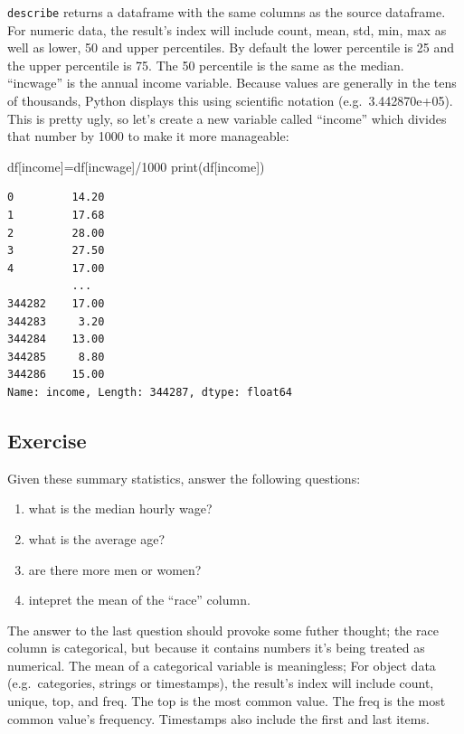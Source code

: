 \documentclass[
  letterpaper,
  DIV=11,
  numbers=noendperiod]{scrreprt}
\newenvironment{Shaded}{\begin{snugshade}}{\end{snugshade}}
\newcommand{\BuiltInTok}[1]{\textcolor[rgb]{0.00,0.23,0.31}{#1}}
\newcommand{\DecValTok}[1]{\textcolor[rgb]{0.68,0.00,0.00}{#1}}
\newcommand{\NormalTok}[1]{\textcolor[rgb]{0.00,0.23,0.31}{#1}}
\newcommand{\OperatorTok}[1]{\textcolor[rgb]{0.37,0.37,0.37}{#1}}
\newcommand{\StringTok}[1]{\textcolor[rgb]{0.13,0.47,0.30}{#1}}
\providecommand{\tightlist}{%
  \setlength{\itemsep}{0pt}\setlength{\parskip}{0pt}}\usepackage{longtable,booktabs,array}
\begin{document}
\texttt{describe} returns a dataframe with the same columns as the
source dataframe. For numeric data, the result's index will include
count, mean, std, min, max as well as lower, 50 and upper percentiles.
By default the lower percentile is 25 and the upper percentile is 75.
The 50 percentile is the same as the median. ``incwage'' is the annual
income variable. Because values are generally in the tens of thousands,
Python displays this using scientific notation (e.g.~3.442870e+05). This
is pretty ugly, so let's create a new variable called ``income'' which
divides that number by 1000 to make it more manageable:

\begin{Shaded}
\begin{Highlighting}[]
\NormalTok{df[}\StringTok{\textquotesingle{}income\textquotesingle{}}\NormalTok{]}\OperatorTok{=}\NormalTok{df[}\StringTok{\textquotesingle{}incwage\textquotesingle{}}\NormalTok{]}\OperatorTok{/}\DecValTok{1000}
\BuiltInTok{print}\NormalTok{(df[}\StringTok{\textquotesingle{}income\textquotesingle{}}\NormalTok{])}
\end{Highlighting}
\end{Shaded}

\begin{verbatim}
0         14.20
1         17.68
2         28.00
3         27.50
4         17.00
          ...  
344282    17.00
344283     3.20
344284    13.00
344285     8.80
344286    15.00
Name: income, Length: 344287, dtype: float64
\end{verbatim}

\hypertarget{exercise-11}{%
\subsection{Exercise}\label{exercise-11}}

Given these summary statistics, answer the following questions:

\begin{enumerate}
\def\labelenumi{\arabic{enumi}.}
\tightlist
\item
  what is the median hourly wage?
\item
  what is the average age?
\item
  are there more men or women?
\item
  intepret the mean of the ``race'' column.
\end{enumerate}

The answer to the last question should provoke some futher thought; the
race column is categorical, but because it contains numbers it's being
treated as numerical. The mean of a categorical variable is meaningless;
For object data (e.g.~categories, strings or timestamps), the result's
index will include count, unique, top, and freq. The top is the most
common value. The freq is the most common value's frequency. Timestamps
also include the first and last items.
\end{document}
